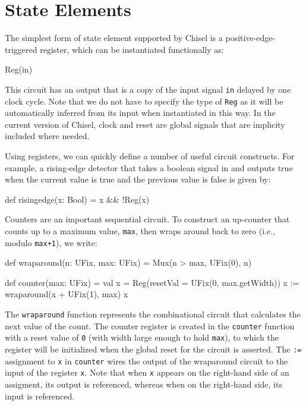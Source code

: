 \documentclass[twocolumn,10pt]{article}
\begin{document}
\section{State Elements}
\label{sec:sequential}


The simplest form of state element supported by Chisel is a
positive-edge-triggered register, which can be instantiated
functionally as:
\begin{scala}
Reg(in)
\end{scala}

\noindent
This circuit has an output that is a copy of the input signal \verb+in+
delayed by one clock cycle.  Note that we do not have to specify the
type of \verb+Reg+ as it will be automatically inferred from its input
when instantiated in this way.  In the current version of Chisel,
clock and reset are global signals that are implicity included where
needed.

Using registers, we can quickly define a number of useful circuit
constructs.  For example, a rising-edge detector that takes a boolean
signal in and outputs true when the current value is true and the
previous value is false is given by:
\begin{scala}
def risingedge(x: Bool) = x && !Reg(x)
\end{scala}

Counters are an important sequential circuit.  To construct an
up-counter that counts up to a maximum value, \verb+max+, then wraps
around back to zero (i.e., modulo \verb!max+1!), we write:
\begin{scala}
def wraparound(n: UFix, max: UFix) =
  Mux(n > max, UFix(0), n)

def counter(max: UFix) = {
  val x = Reg(resetVal = UFix(0, max.getWidth))
  x := wraparound(x + UFix(1), max)
  x
}
\end{scala}

\noindent
The \verb!wraparound! function represents the combinational circuit
that calculates the next value of the count.  The counter register is
created in the \verb!counter! function with a reset value of \verb!0! (with width large enough to hold \verb+max+),
to which the register will be initialized when the global reset for the circuit is asserted.
The \verb!:=! assignment to \verb!x! in \verb!counter! wires the
output of the wraparound circuit to the input of the register
\verb!x!.  Note that when \verb!x! appears on the right-hand side of
an assigment, its output is referenced, whereas when on the right-hand
side, its input is referenced.
\end{document}
